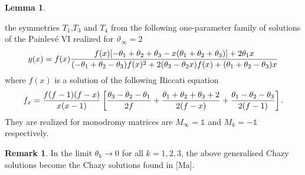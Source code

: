 \documentclass[12pt]{article}
\def\thi{{\vartheta_\infty}}
\newcommand{\ID}{\mathbb{1}}
\theoremstyle{definition}
\newtheorem{rmk}[df]{Remark}
\theoremstyle{theorem}
\newtheorem{lm}[df]{Lemma}
\begin{document}
\begin{lm}
\begin{enumerate}
the symmetries $T_1$,$T_3$ and $T_4$ from the following one-parameter 
family of solutions of the Painlev\'e VI realized for $\thi=2$
\begin{equation}
y(x)=f(x){f(x)[-\theta_1+\theta_2+\theta_3-x(\theta_1+\theta_2+\theta_3)]
+2\theta_1 x\over (-\theta_1+\theta_2-\theta_3) f(x)^2 +
2(\theta_3-\theta_2 x)f(x)+ (\theta_1+\theta_2-\theta_3)x}
\label{rt1}\end{equation}
where $f(x)$ is a solution of the following Riccati equation
\begin{equation}
f_x={f(f-1)(f-x)\over x(x-1)}
\left[{\theta_3-\theta_2-\theta_1\over 2 f}+
{\theta_1+\theta_2+\theta_3+2\over 2(f-x)}+
{\theta_1-\theta_2-\theta_3\over 2(f-1)}\right]. 
\label{rt}\end{equation}
They are realized for
monodromy matrices are $M_\infty=\ID$ and $M_k=-\ID$ respectively.
\end{enumerate}
\label{lmchazy}\end{lm}

\begin{rmk}
In the limit $\theta_k\to0$ for all
$k=1,2,3$, the above generalised Chazy solutions become the Chazy
solutions found in [Ma].
\label{rmkcha}\end{rmk}
\end{document}
